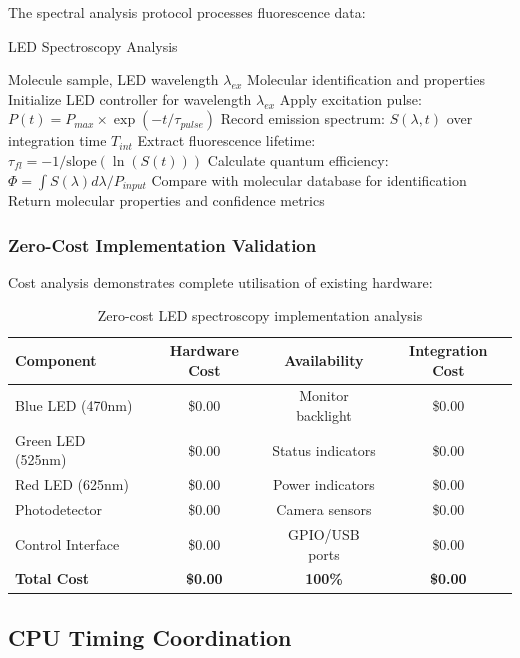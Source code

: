 \documentclass[12pt,a4paper]{article}
\begin{document}
The spectral analysis protocol processes fluorescence data:

\begin{algorithm}[H]
\caption{LED Spectroscopy Analysis}
\begin{algorithmic}[1]
\REQUIRE Molecule sample, LED wavelength $\lambda_{ex}$
\ENSURE Molecular identification and properties
\STATE Initialize LED controller for wavelength $\lambda_{ex}$
\STATE Apply excitation pulse: $P(t) = P_{max} \times \exp(-t/\tau_{pulse})$
\STATE Record emission spectrum: $S(\lambda, t)$ over integration time $T_{int}$
\STATE Extract fluorescence lifetime: $\tau_{fl} = -1/\text{slope}(\ln(S(t)))$
\STATE Calculate quantum efficiency: $\Phi = \int S(\lambda) d\lambda / P_{input}$
\STATE Compare with molecular database for identification
\STATE Return molecular properties and confidence metrics
\end{algorithmic}
\end{algorithm}

\subsubsection{Zero-Cost Implementation Validation}

Cost analysis demonstrates complete utilisation of existing hardware:

\begin{table}[H]
\centering
\begin{tabular}{|l|c|c|c|}
\hline
\textbf{Component} & \textbf{Hardware Cost} & \textbf{Availability} & \textbf{Integration Cost} \\
\hline
Blue LED (470nm) & \$0.00 & Monitor backlight & \$0.00 \\
Green LED (525nm) & \$0.00 & Status indicators & \$0.00 \\
Red LED (625nm) & \$0.00 & Power indicators & \$0.00 \\
Photodetector & \$0.00 & Camera sensors & \$0.00 \\
Control Interface & \$0.00 & GPIO/USB ports & \$0.00 \\
\hline
\textbf{Total Cost} & \textbf{\$0.00} & \textbf{100\%} & \textbf{\$0.00} \\
\hline
\end{tabular}
\caption{Zero-cost LED spectroscopy implementation analysis}
\end{table}

\subsection{CPU Timing Coordination}
\end{document}
